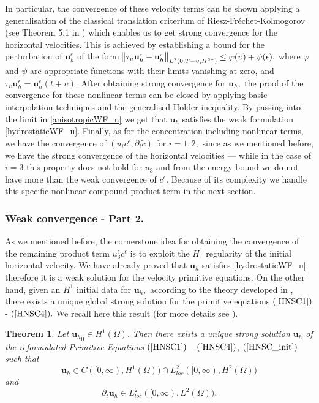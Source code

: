 \documentclass[11pt, a4paper]{article}
\newtheorem{theorem}{Theorem}
\begin{document}
In particular, the convergence of these velocity terms can be shown applying a generalisation of the classical translation criterium of Riesz-Fr\'echet-Kolmogorov (see Theorem 5.1 in \cite{azerad2001mathematical}) which enables us to get strong convergence for the horizontal velocities. This is achieved by establishing a bound for the perturbation of $\mathbf{u}_h^{\epsilon}$ of the form $\norm{\tau_\upsilon \mathbf{u}_h^{\epsilon} - \mathbf{u}_h^{\epsilon}}_{L^2(0,T-\upsilon, {H^2}^*)} \leq \varphi(\upsilon) + \psi(\epsilon),$ where $\varphi$ and $\psi$ are appropriate functions with their limits vanishing at zero, and $\tau_\upsilon \mathbf{u}_h^{\epsilon} = \mathbf{u}_h^{\epsilon} (t+\upsilon) $. After obtaining strong convergence for $\mathbf{u}_h,$ the proof of the convergence for these nonlinear terms can be closed by applying basic interpolation techniques and the generalised H\"older inequality. By passing into the limit in \eqref{anisotropicWF_u} we get that $\mathbf{u}_h$ satisfies the weak formulation \eqref{hydrostaticWF_u}.
Finally, as for the concentration-including nonlinear terms, we have the convergence of $(u_i c^\epsilon, \partial_i \tilde{c})$ for $i=1,2,$ since as we mentioned before, we have the strong convergence of the horizontal velocities --- while in the case of $i=3$ this property does not hold for $u_3$ and from the energy bound we do not have more than the weak convergence of $c^\epsilon$. Because of its complexity we handle this specific nonlinear compound product term in the next section.

\subsubsection{Weak convergence - Part 2.}

As we mentioned before, the cornerstone idea for obtaining the convergence of the remaining product term $u_3^\epsilon c^\epsilon$ is to exploit the $H^1$ regularity of the initial horizontal velocity. We have already proved that $\mathbf{u}_h$ satisfies \eqref{hydrostaticWF_u} therefore it is a weak solution for the velocity primitive equations. On the other hand,  given an $H^1$ initial data for $\mathbf{u}_h,$ according to the theory developed in \cite{cao2007global}, there exists a unique global strong solution for the primitive equations $(\ref{HNSC1})$ - $(\ref{HNSC4}).$ We recall here this result (for more details see \cite{cao2007global}).

\begin{theorem} \label{PE3DWellPosedness}
Let ${\mathbf{u}_h}_0 \in H^1(\Omega).$ Then there exists a unique strong solution $\mathbf{u}_h$ of the reformulated Primitive Equations $(\ref{HNSC1})$ - $(\ref{HNSC4})$, $(\ref{HNSC_init})$ such that $$\mathbf{u}_h \in C([0, \infty), H^1(\Omega)) \cap L^2_{loc}([0, \infty), H^2(\Omega))$$ and $$\partial_t \mathbf{u}_h \in L^2_{loc} ([0,\infty), L^2(\Omega)).$$
\end{theorem}
\end{document}
